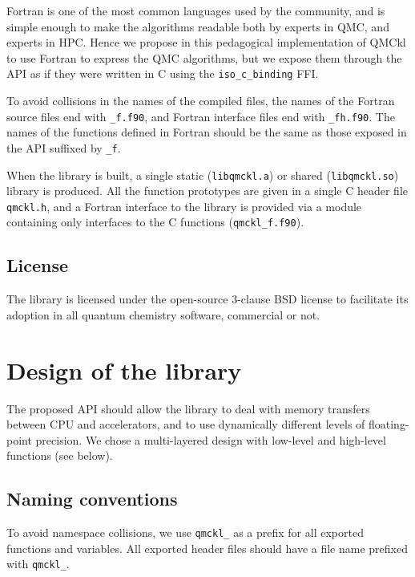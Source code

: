 Fortran is one of the most common languages used by the community, and
is simple enough to make the algorithms readable both by experts in
\ac{QMC}, and experts in \ac{HPC}. Hence we propose in this
pedagogical implementation of \ac{QMCkl} to use Fortran to express the
QMC algorithms, but we expose them through the \ac{API} as if they
were written in C using the \texttt{iso_c_binding} \ac{FFI}.

To avoid collisions in the names of the compiled files, the names of
the Fortran source files end with \texttt{_f.f90}, and Fortran
interface files end with \texttt{_fh.f90}.
The names of the functions defined in Fortran should be the
same as those exposed in the \ac{API} suffixed by \texttt{_f}.

When the library is built, a single static
(\texttt{libqmckl.a}) or shared
(\texttt{libqmckl.so}) library is produced. All the
function prototypes are given in a single C header file
\texttt{qmckl.h}, and a Fortran interface to the library is
provided via a module containing only interfaces to the C functions
(\texttt{qmckl_f.f90}).

\subsection{License}

The library is licensed under the open-source 3-clause BSD license to facilitate
its adoption in all quantum chemistry software, commercial or not.


\section{Design of the library}

The proposed \ac{API} should allow the library to deal with memory
transfers between CPU and accelerators, and to use dynamically
different levels of floating-point precision.  We chose a
multi-layered design with low-level and high-level functions (see
below).

\subsection{Naming conventions}

To avoid namespace collisions, we use \texttt{qmckl_} as a prefix for
all exported functions and variables.  All exported header files
should have a file name prefixed with \texttt{qmckl_}.

